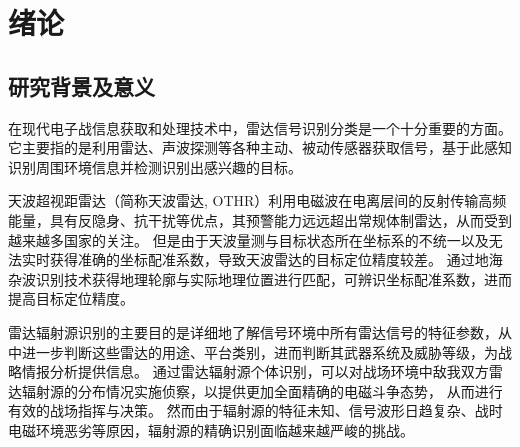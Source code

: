 
\chapter{绪论}
\label{sec:intro}
\section{研究背景及意义}








在现代电子战信息获取和处理技术中，雷达信号识别分类是一个十分重要的方面。它主要指的是利用雷达、声波探测等各种主动、被动传感器获取信号，基于此感知识别周围环境信息并检测识别出感兴趣的目标。

天波超视距雷达（简称天波雷达, OTHR）利用电磁波在电离层间的反射传输高频能量，具有反隐身、抗干扰等优点，其预警能力远远超出常规体制雷达，从而受到越来越多国家的关注。
但是由于天波量测与目标状态所在坐标系的不统一以及无法实时获得准确的坐标配准系数，导致天波雷达的目标定位精度较差。
通过地海杂波识别技术获得地理轮廓与实际地理位置进行匹配，可辨识坐标配准系数，进而提高目标定位精度。

雷达辐射源识别的主要目的是详细地了解信号环境中所有雷达信号的特征参数，从中进一步判断这些雷达的用途、平台类别，进而判断其武器系统及威胁等级，为战略情报分析提供信息。
通过雷达辐射源个体识别，可以对战场环境中敌我双方雷达辐射源的分布情况实施侦察，以提供更加全面精确的电磁斗争态势，
从而进行有效的战场指挥与决策。
然而由于辐射源的特征未知、信号波形日趋复杂、战时电磁环境恶劣等原因，辐射源的精确识别面临越来越严峻的挑战。

